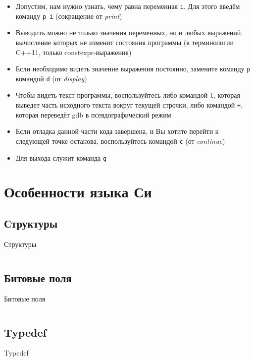 \documentclass[handout]{beamer}
\begin{document}
\begin{frame}
	\begin{itemize}
		\item{Допустим, нам нужно узнать, чему равна переменная \texttt{i}. Для этого введём команду \texttt{p i} (сокращение от \emph{print})}\pause
		\item{Выводить можно не только значения переменных, но и любых выражений, вычисление которых не изменит состояния программы (в терминологии C++11, только constexpr-выражения)}\pause
		\item{Если необходимо видеть значение выражения постоянно, замените команду \texttt{p} командой \texttt{d} (от \emph{display})}\pause
		\item{Чтобы видеть текст программы, воспользуйтесь либо командой \texttt{l}, которая выведет часть исходного текста вокруг текущей строчки, либо командой \texttt{+}, которая переведёт gdb в псевдографический режим}\pause
		\item{Если отладка данной части кода завершена, и Вы хотите перейти к следующей точке останова, воспользуйтесь командой \texttt{c} (от \emph{continue})}\pause
		\item{Для выхода служит команда \texttt{q}}
	\end{itemize}
\end{frame}

\section{Особенности языка Си}

\subsection{Структуры}
\begin{frame}{Структуры}
	\inputminted[linenos,bgcolor=listing,fontsize=\small]{C}{files/c_programming_langauge/struct.c}
\end{frame}

\subsection{Битовые поля}
\begin{frame}{Битовые поля}
	\inputminted[linenos,bgcolor=listing,fontsize=\small]{C}{files/c_programming_langauge/bitfield.c}
\end{frame}
	
\subsection{Typedef}
\begin{frame}{Typedef}
	\inputminted[linenos,bgcolor=listing,fontsize=\small]{C}{files/c_programming_langauge/typedef.c}
\end{frame}
\end{document}
